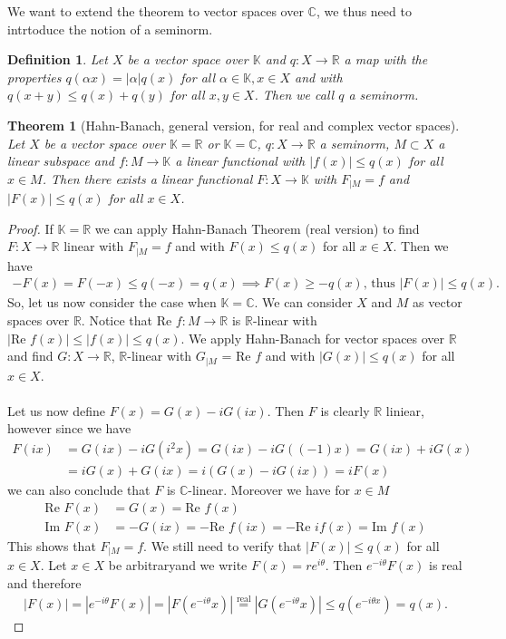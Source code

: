 \documentclass[11pt,a4paper]{article}
\newtheorem{thm}{Theorem}[section]
\newtheorem{defn}{Definition}[section]
\theoremstyle{definition}
\begin{document}
\noindent We want to extend the theorem to vector spaces over $\mathbb{C}$, we thus need to intrtoduce the notion of a seminorm. 
\begin{defn} Let $X$ be a vector space over $\mathbb{K}$ and $q: X \to \mathbb{R}$ a map with the properties $q( \alpha x) = | \alpha | q(x)$ for all $\alpha \in \mathbb{K}, x \in X$ and with $q(x+y) \leq q(x) + q(y)$ for all $x,y \in X$. Then we call $q$ a seminorm. 
\end{defn}
\newpage
\begin{thm}[Hahn-Banach, general version, for real and complex vector spaces] Let $X$ be a vector space over $\mathbb{K}= \mathbb{R}$ or $\mathbb{K}= \mathbb{C}$, $q :X \to \mathbb{R}$ a seminorm, $M \subset X$ a linear subspace and $f: M \to \mathbb{K}$ a linear functional with $|f(x)| \leq q(x)$ for all $x \in M$. Then there exists a linear functional $F: X \to \mathbb{K}$ with $F_{ \mid M} = f$ and $|F(x)| \leq q(x)$ for all $x \in X$. 
\end{thm}
\begin{proof}
If $\mathbb{K}= \mathbb{R}$ we can apply Hahn-Banach Theorem (real version) to find $F: X \to \mathbb{R}$ linear with $F_{ \mid M} =f$ and with $F(x) \leq q(x)$ for all $x \in X$. Then we have
\begin{align*}
-F(x) = F(-x) \leq q(-x)=q(x) \implies F(x) \geq -q(x) \text{, thus } |F(x)| \leq q(x).
\end{align*}
So, let us now consider the case when $\mathbb{K}= \mathbb{C}$. We can consider $X$ and $M$ as vector spaces over $\mathbb{R}$. Notice that Re $f: M \to \mathbb{R}$ is $\mathbb{R}$-linear with $|\text{Re } f(x) | \leq |f(x)| \leq q(x)$. We apply Hahn-Banach for vector spaces over $\mathbb{R}$ and find $G: X \to \mathbb{R}$, $\mathbb{R}$-linear with $G_{ \mid M}$ = Re $f$ and with $|G(x)| \leq q(x)$ for all $x \in X$. 
\\\\
Let us now define $F(x) = G(x)-iG(ix)$. Then $F$ is clearly $\mathbb{R}$ liniear, however since we have \begin{align*}
F(ix)&=G(ix)-iG(i^2x) = G(ix)-iG((-1)x)=G(ix)+iG(x) \\
& = iG(x) +G(ix) = i(G(x)-iG(ix))=iF(x)
\end{align*}
we can also conclude that $F$ is $\mathbb{C}$-linear. Moreover we have for $x \in M$ 
\begin{align*}
\text{Re } F(x)&=G(x)=\text{Re } f(x) \\
\text{Im } F(x)& = -G(ix)= - \text{Re } f(ix) = - \text{Re } if(x) = \text{Im } f(x)
\end{align*}
This shows that $F_{ \mid M } = f$. We still need to verify that $|F(x)| \leq q(x)$ for all $x \in X$. Let $x \in X$ be arbitraryand we write $F(x)=re^{i \theta}$. Then $e^{-i \theta} F(x)$ is real and therefore
\begin{align*}
|F(x)| = |e^{-i \theta} F(x)| = |F(e^{-i \theta} x) | \overset{\text{real}}= | G(e^{- i \theta} x)| \leq q(e^{- i \theta x}) = q(x). 
\end{align*}
\end{proof}
\end{document}

